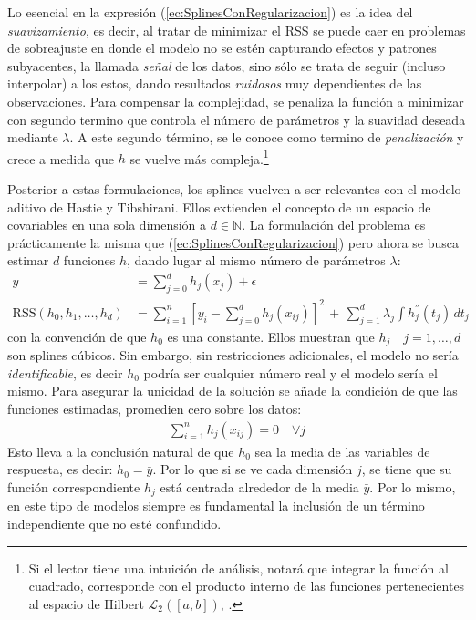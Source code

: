 \documentclass[../../Main/Main.tex]{subfiles}
\begin{document}
Lo esencial en la expresión (\ref{ec:SplinesConRegularizacion}) es la idea del \emph{suavizamiento}, es decir, al tratar de minimizar el RSS se puede caer en problemas de sobreajuste en donde el modelo no se estén capturando efectos y patrones subyacentes, la llamada \emph{señal} de los datos, sino sólo se trata de seguir (incluso interpolar) a los estos, dando resultados \textit{ruidosos} muy dependientes de las observaciones. Para compensar la complejidad, se penaliza la función a minimizar con segundo termino que controla el número de parámetros y la suavidad deseada mediante $\lambda$. A este segundo término, se le conoce como termino de \emph{penalización} y crece a medida que $h$ se vuelve más compleja.\footnote{Si el lector tiene una intuición de análisis, notará que integrar la función al cuadrado, corresponde con el producto interno de las funciones pertenecientes al espacio de Hilbert $\mathcal{L}_2([a,b])$, \citet{bergstrom1985estimation}.}

Posterior a estas formulaciones, los splines vuelven a ser relevantes con el modelo aditivo de Hastie y Tibshirani. Ellos extienden el concepto de un espacio de covariables en una sola dimensión a $d\in\mathbb{N}$. La formulación del problema es prácticamente la misma que  (\ref{ec:SplinesConRegularizacion}) pero ahora se busca estimar $d$ funciones $h$, dando lugar al mismo número de parámetros $\lambda$:
\begin{align*}
	y &= \sum_{j = 0}^d h_j(x_j) + \epsilon \\	
	\text{RSS}(h_0, h_1, \ldots, h_d) &= \sum_{i = 1}^n[y_i - \sum_{j = 0}^d h_j(x_{ij})]^2 \, + \, \sum_{j = 1}^d\lambda_j 			\int h_j^{''}(t_j) \, dt_j
\end{align*}
con la convención de que $h_0$ es una constante. Ellos muestran que $h_j \quad j = 1,\ldots,d$ son splines cúbicos. Sin embargo, sin restricciones adicionales, el modelo no sería \textit{identificable}, es decir $h_0$ podría ser cualquier número real y el modelo sería el mismo. Para asegurar la unicidad de la solución se añade la condición de que las funciones estimadas, promedien cero sobre los datos:
\begin{align}
	\sum_{i = 1}^n h_j(x_{ij}) = 0 \quad \forall j \label{ec:RestriccionGAM}
\end{align}
Esto lleva a la conclusión natural de que $h_0$ sea la media de las variables de respuesta, es decir: $h_0 = \bar{y}$. Por lo que si se ve cada dimensión $j$, se tiene que su función correspondiente $h_j$ está centrada alrededor de la media $\bar{y}$. Por lo mismo, en este tipo de modelos siempre es fundamental la inclusión de un término independiente que no esté confundido.
\end{document}

